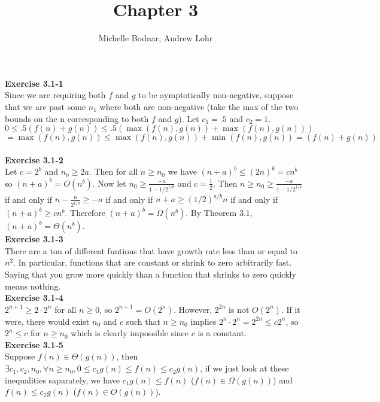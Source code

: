 \documentclass{article}
\title{Chapter 3}
\author{Michelle Bodnar, Andrew Lohr}
\begin{document}
\maketitle

\noindent\textbf{Exercise 3.1-1}\\

Since we are requiring both $f$ and $g$ to be aymptotically non-negative, suppose that we are past some $n_1$ where both are non-negative (take the max of the two bounds on the n corresponding to both $f$ and $g$). Let $c_1=.5$ and $c_2=1$.
\[
0\le .5(f(n)+g(n)) \le .5(\max(f(n),g(n)) + \max(f(n),g(n))) \]\[= \max(f(n),g(n)) \le \max(f(n),g(n))+\min(f(n),g(n)) = (f(n)+g(n))
\]\\

\noindent\textbf{Exercise 3.1-2}\\

Let $c = 2^b$ and $n_0 \geq 2a$.  Then for all $n \geq n_0$ we have $(n+a)^b \leq (2n)^b = cn^b$ so $(n+a)^b = O(n^b)$.  Now let $n_0 \geq \frac{-a}{1-1/2^{1/b}}$ and $c = \frac{1}{2}$.  Then $n \geq n_0 \geq \frac{-a}{1-1/2^{1/b}}$ if and only if $n - \frac{n}{2^{1/b}} \geq -a$ if and only if $n+a \geq (1/2)^{a/b}n$ if and only if $(n+a)^b \geq cn^b$.  Therefore $(n+a)^b = \Omega(n^b)$.  By Theorem 3.1, $(n+a)^b = \Theta(n^b)$.\\

\noindent\textbf{Exercise 3.1-3}\\

There are a ton of different funtions that have growth rate less than or equal to $n^2$. In particular, functions that are constant or shrink to zero arbitrarily fast. Saying that you grow more quickly than a function that shrinks to zero quickly means nothing. \\

\noindent\textbf{Exercise 3.1-4}\\

$2^{n+1} \geq 2\cdot 2^n$ for all $n \geq 0$, so $2^{n+1} = O(2^n)$.  However, $2^{2n}$ is not $O(2^n)$.  If it were, there would exist $n_0$ and $c$ such that $n \geq n_0$ implies $2^n \cdot 2^n = 2^{2n} \leq c2^n$, so $2^n \leq c$ for $n \geq n_0$ which is clearly impossible since $c$ is a constant.  \\


\noindent\textbf{Exercise 3.1-5}\\

Suppose $f(n)\in \Theta(g(n))$, then $\exists c_1,c_2,n_0, \forall n\ge n_0, 0\le c_1 g(n) \le f(n) \le c_2 g(n)$, if we just look at these inequalities saparately, we have $c_1 g(n) \le f(n)$ ($f(n) \in \Omega(g(n))$) and $f(n) \le c_2 g(n)$ ($f(n)\in O(g(n))$).
\end{document}
